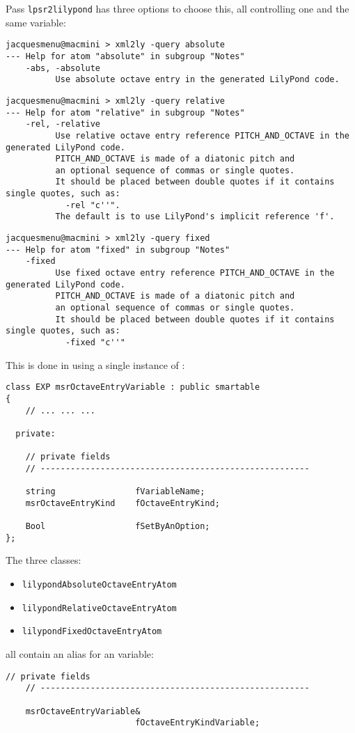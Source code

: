 Pass {\tt lpsr2lilypond} has three options to choose this, all controlling one and the same variable:
\begin{lstlisting}[language=Terminal]
jacquesmenu@macmini > xml2ly -query absolute
--- Help for atom "absolute" in subgroup "Notes"
    -abs, -absolute
          Use absolute octave entry in the generated LilyPond code.
\end{lstlisting}

\begin{lstlisting}[language=Terminal]
jacquesmenu@macmini > xml2ly -query relative
--- Help for atom "relative" in subgroup "Notes"
    -rel, -relative
          Use relative octave entry reference PITCH_AND_OCTAVE in the generated LilyPond code.
          PITCH_AND_OCTAVE is made of a diatonic pitch and
          an optional sequence of commas or single quotes.
          It should be placed between double quotes if it contains single quotes, such as:
            -rel "c''".
          The default is to use LilyPond's implicit reference 'f'.
\end{lstlisting}

\begin{lstlisting}[language=Terminal]
jacquesmenu@macmini > xml2ly -query fixed
--- Help for atom "fixed" in subgroup "Notes"
    -fixed
          Use fixed octave entry reference PITCH_AND_OCTAVE in the generated LilyPond code.
          PITCH_AND_OCTAVE is made of a diatonic pitch and
          an optional sequence of commas or single quotes.
          It should be placed between double quotes if it contains single quotes, such as:
            -fixed "c''"
\end{lstlisting}

This is done in  using a single instance of :
\begin{lstlisting}[language=CPlusPlus]
class EXP msrOctaveEntryVariable : public smartable
{
	// ... ... ...

  private:

    // private fields
    // ------------------------------------------------------

    string                fVariableName;
    msrOctaveEntryKind    fOctaveEntryKind;

    Bool                  fSetByAnOption;
};

\end{lstlisting}

The three classes:
\begin{itemize}
\item  {\tt lilypondAbsoluteOctaveEntryAtom}
\item  {\tt lilypondRelativeOctaveEntryAtom}
\item  {\tt lilypondFixedOctaveEntryAtom}
\end{itemize}
all contain an alias for an  variable:
\begin{lstlisting}[language=CPlusPlus]
    // private fields
    // ------------------------------------------------------

    msrOctaveEntryVariable&
                          fOctaveEntryKindVariable;
\end{lstlisting}

